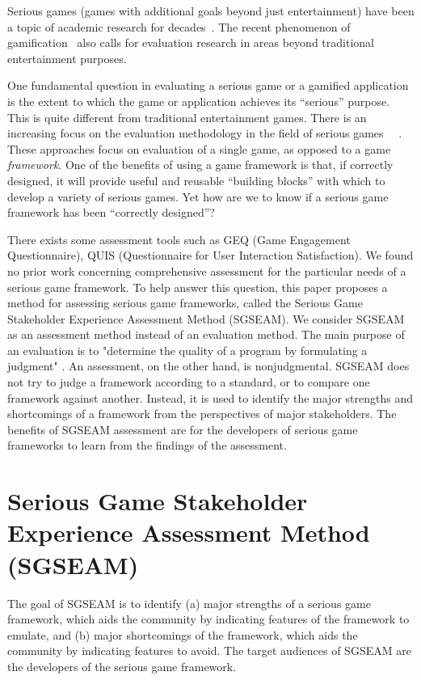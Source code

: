 \documentclass{sigchi}
\begin{document}
Serious games (games with additional goals beyond just entertainment) have been a topic
of academic research for decades~\cite{Zyda2005}. The recent phenomenon of
gamification~\cite{Deterding2011mt} also calls for evaluation research in areas beyond
traditional entertainment purposes.

One fundamental question in evaluating a serious game or a gamified application is the 
extent to which the game or application achieves its ``serious'' purpose. This is quite different from traditional entertainment games. There is an increasing
focus on the evaluation methodology in the field of serious games ~\cite{Mayer2012233}~\cite{harteveld2010triadic}. These approaches focus on evaluation of a single game, as opposed to a game {\em
  framework}. One of the benefits of 
using a game framework is that, if correctly designed, it will provide useful and
reusable ``building blocks'' with which to develop a variety of serious games. Yet how are we to know if a serious
game framework has been ``correctly designed''?

There exists some assessment tools such as GEQ (Game Engagement Questionnaire)\cite{brockmyer2009development}, QUIS (Questionnaire for User Interaction Satisfaction)\cite{harper1993improving}. We found no prior work concerning comprehensive assessment for 
the particular needs of a serious game framework. To help answer this question, this paper
proposes a method for assessing serious game frameworks, called the Serious Game Stakeholder
Experience Assessment Method (SGSEAM). We consider
SGSEAM as an assessment method instead of an evaluation method. The main purpose of an
evaluation is to "determine the quality of a program by formulating a judgment"
\cite{hurteau2009legitimate}. An assessment, on the other hand, is nonjudgmental. SGSEAM does
not try to judge a framework according to a standard, or to compare one framework against another. Instead, it is used to identify the major
strengths and shortcomings of a framework from the perspectives of major stakeholders. The benefits of 
SGSEAM assessment are for the developers of serious game frameworks to learn from the findings of the assessment.

\section{Serious Game Stakeholder Experience Assessment Method (SGSEAM)}

The goal of SGSEAM is to identify (a) major strengths of a serious game
framework, which aids the community by indicating features of the framework to emulate, and
(b) major shortcomings of the framework, which aids the community by indicating features to avoid.
The target audiences of SGSEAM are the developers of the serious game framework.
\end{document}
